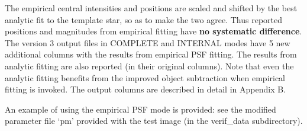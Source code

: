 The empirical central intensities and positions are scaled and shifted 
by the best analytic fit to the template star, so as to make the two agree.
Thus reported positions and magnitudes from empirical fitting have 
{\bf no systematic difference}. The version 3 output files in COMPLETE and 
INTERNAL modes have 5 new additional columns with the results from 
empirical PSF fitting. The results from analytic fitting are also reported 
(in their original columns). Note that even the analytic fitting 
benefits from the improved object subtraction when empirical fitting 
is invoked. The output columns are described in detail in Appendix B.

An example of using the empirical PSF mode is provided: see the modified 
parameter file `pm' provided with the test image (in 
the verif\_data subdirectory). 















